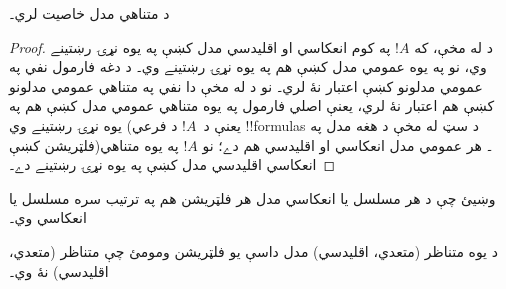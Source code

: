 \documentclass[../../../include/open-logic-section]{subfiles}
\begin{document}
\begin{cor}
   د متناهي مدل خاصيت لري۔
\end{cor}

\begin{proof}
  د  له مخې، که $!A$ په کوم
  انعکاسي او اقليدسي مدل کښې په يوه نړۍ رښتينے وي، نو په يوه
  عمومي مدل کښې هم په يوه نړۍ رښتينے وي۔ د دغه فارمول نفي
  په عمومي مدلونو کښې اعتبار نۀ لري۔ نو د
   له مخې دا نفي په متناهي عمومي مدلونو کښې
  هم اعتبار نۀ لري، يعنې اصلي فارمول په يوه متناهي عمومي مدل کښې هم
  په يوه نړۍ رښتينے وي (يعنې د~$!A$ د فرعي !!{formula}s د سټ
  له مخې د هغه مدل په فلټريشن کښې)۔ هر عمومي مدل انعکاسي او
  اقليدسي هم دے؛ نو $!A$ په يوه متناهي انعکاسي اقليدسي مدل
  کښې په يوه نړۍ رښتينے دے۔
\end{proof}

\begin{prob}
  وښيئ چې د هر مسلسل يا انعکاسي مدل هر فلټريشن هم په ترتيب سره
  مسلسل يا انعکاسي وي۔
\end{prob}

\begin{prob}
  د يوه متناظر (متعدي، اقليدسي) مدل داسې يو فلټريشن ومومئ چې
  متناظر (متعدي، اقليدسي) نۀ وي۔
\end{prob}
\end{document}
